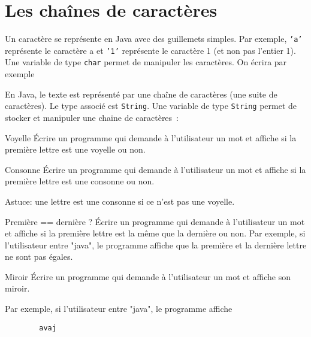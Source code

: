 \documentclass[a4paper,11pt]{style-esi/td}
\begin{document}
\section{Les chaînes de caractères}
 
 	Un caractère se représente en Java avec des guillemets simples.
	Par exemple, \texttt{'a'} représente le caractère a et \texttt{'1'} représente le caractère 1 (et non pas l'entier 1).
	Une variable de type \texttt{char} permet de manipuler les caractères.
	On écrira par exemple  
	
	En Java, le texte est représenté par une chaîne de caractères (une suite de caractères). 
	Le type associé est \texttt{String}.
	Une variable de type \texttt{String} permet de stocker et manipuler une chaine de caractères~:

	\bigskip


	\begin{Exercice}{Voyelle}	
		\'Ecrire un programme qui demande à l'utilisateur 
		un mot et affiche si la première lettre est une voyelle ou non.
	\end{Exercice}

	\begin{Exercice}{Consonne}	
		\'Ecrire un programme qui demande à l'utilisateur 
		un mot et affiche si la première lettre est une consonne ou non.
		
		Astuce: une lettre est une consonne si ce n'est pas une voyelle.
	\end{Exercice}

	
	\begin{Exercice}{Première == dernière ?}	
		\'Ecrire un programme qui demande à l'utilisateur 
		un mot et affiche si la première lettre est la même que la dernière ou non.
		Par exemple, si l'utilisateur entre "java", le programme affiche que la première et 
		la dernière lettre ne sont pas égales.
	\end{Exercice}

	\begin{Exercice}{Miroir}	
		\'Ecrire un programme qui demande à l'utilisateur 
		un mot et affiche son miroir.
		
		Par exemple, si l'utilisateur entre "java", le programme affiche
		
		\begin{verbatim}
		avaj
		\end{verbatim}
	\end{Exercice}
\end{document}
